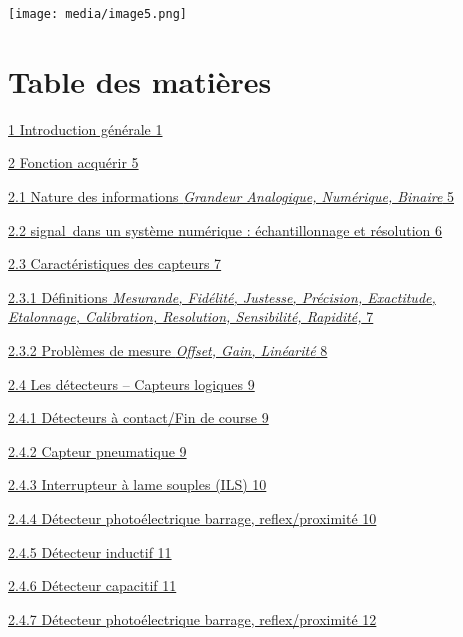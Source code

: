 \documentclass[
]{article}
\begin{document}
\texttt{[image: media/image5.png]}

\hypertarget{table-des-matiuxe8res}{%
\section{Table des matières}\label{table-des-matiuxe8res}}

\protect\hyperlink{introduction-guxe9nuxe9rale}{1 Introduction générale
1}

\protect\hyperlink{fonction-acquuxe9rir}{2 Fonction acquérir 5}

\protect\hyperlink{nature-des-informations-grandeur-analogique-numuxe9rique-binaire}{2.1
Nature des informations \emph{Grandeur Analogique, Numérique, Binaire}
5}

\protect\hyperlink{signal-dans-un-systuxe8me-numuxe9rique-uxe9chantillonnage-et-ruxe9solution}{2.2
signal~dans un système numérique : échantillonnage et résolution 6}

\protect\hyperlink{caractuxe9ristiques-des-capteurs}{2.3
Caractéristiques des capteurs 7}

\protect\hyperlink{duxe9finitions}{2.3.1 Définitions \emph{Mesurande,
Fidélité, Justesse, Précision, Exactitude, Etalonnage, Calibration,
Resolution, Sensibilité, Rapidité,} 7}

\protect\hyperlink{probluxe8mes-de-mesure-offset-gain-linuxe9arituxe9}{2.3.2
Problèmes de mesure \emph{Offset, Gain, Linéarité} 8}

\protect\hyperlink{les-duxe9tecteurs-capteurs-logiques}{2.4 Les
détecteurs -- Capteurs logiques 9}

\protect\hyperlink{duxe9tecteurs-uxe0-contactfin-de-course}{2.4.1
Détecteurs à contact/Fin de course 9}

\protect\hyperlink{capteur-pneumatique}{2.4.2 Capteur pneumatique 9}

\protect\hyperlink{interrupteur-uxe0-lame-souples-ils}{2.4.3
Interrupteur à lame souples (ILS) 10}

\protect\hyperlink{duxe9tecteur-photouxe9lectrique-barrage-reflexproximituxe9}{2.4.4
Détecteur photoélectrique barrage, reflex/proximité 10}

\protect\hyperlink{duxe9tecteur-inductif}{2.4.5 Détecteur inductif 11}

\protect\hyperlink{duxe9tecteur-capacitif}{2.4.6 Détecteur capacitif 11}

\protect\hyperlink{duxe9tecteur-photouxe9lectrique-barrage-reflexproximituxe9-1}{2.4.7
Détecteur photoélectrique barrage, reflex/proximité 12}
\end{document}
